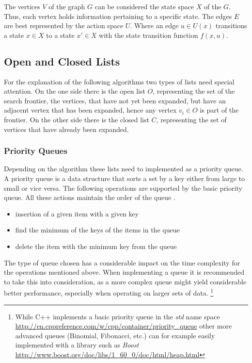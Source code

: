 The vertices $V$ of the graph $G$ can be considered the state space $X$ of the $G$. Thus, each vertex holds information pertaining to a specific state. The edges $E$ are best represented by the action space $U$. Where an edge $u \in U(x)$ transitions a state $x \in X$ to a state $x' \in X$ with the state transition function $f(x,u)$.

\subsection{Open and Closed Lists}
For the explanation of the following algorithms two types of lists need special attention. On the one side there is the open list $O$, representing the set of the search frontier, the vertices, that have not yet been expanded, but have an adjacent vertex that has been expanded, hence any vertex $v_i \in O$ is part of the frontier. On the other side there is the closed list $C$, representing the set of vertices that have already been expanded.

\subsubsection{Priority Queues}
Depending on the algorithm these lists need to implemented as a priority queue. A priority queue is a data structure that sorts a set by a key either from large to small or vice versa. The following operations are supported by the basic priority queue. All these actions maintain the order of the queue \cite{Skiena.2008}.

\begin{itemize}
    \item insertion of a given item with a given key
    \item find the minimum of the keys of the items in the queue
    \item delete the item with the minimum key from the queue
\end{itemize}

The type of queue chosen has a considerable impact on the time complexity for the operations mentioned above. When implementing a queue it is recommended to take this into consideration, as a more complex queue might yield considerable better performance, especially when operating on larger sets of data. \footnote{While C++ implements a basic priority queue in the \emph{std} name space \url{http://en.cppreference.com/w/cpp/container/priority_queue} other more advanced queues (Binomial, Fibonacci, etc.) can for example easily implemented with a library such as \emph{Boost} \url{http://www.boost.org/doc/libs/1_60_0/doc/html/heap.html}}

